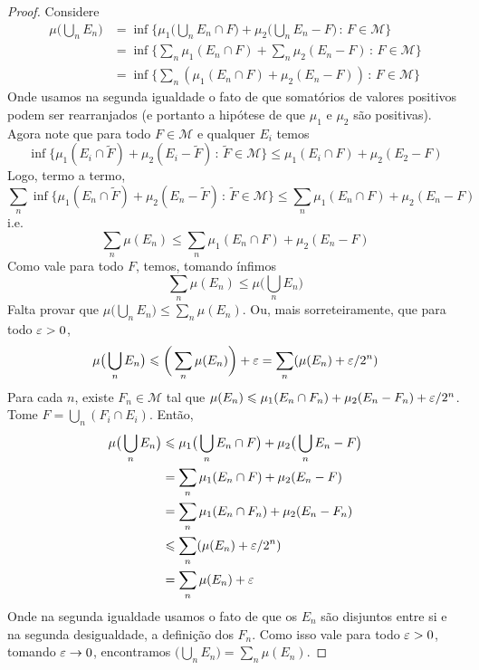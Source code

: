 \begin{proof}
    Considere
    \begin{align*}
        \mu \bigg(\bigcup_{n} E_n \bigg) &= \inf \bigg\{\mu_1\bigg( \bigcup_n E_n \cap F \bigg) + \mu_2\bigg( \bigcup_n E_n - F \bigg) \, : \, F \in \mathcal{M} \bigg\}\\
        &= \inf \bigg\{ \sum_n \mu_1(E_n \cap F) + \sum_n \mu_2(E_n - F) \, : \, F \in \mathcal{M} \bigg\}\\
        &= \inf \bigg\{ \sum_n ( \mu_1(E_n \cap F) + \mu_2(E_n - F) ) \, : \, F \in \mathcal{M} \bigg\}
    \end{align*}
    Onde usamos na segunda igualdade o fato de que somatórios de valores positivos podem ser rearranjados (e portanto a hipótese de que $\mu_1$ e $\mu_2$ são positivas).
    Agora note que para todo $F \in \mathcal{M}$ e qualquer $E_i$ temos
    $$\inf\{\mu_1(E_i \cap \tilde{F}) + \mu_2(E_i - \tilde{F}) \, : \, \tilde{F} \in \mathcal{M}\} \leq \mu_1(E_i \cap F) + \mu_2(E_2 - F)$$
    Logo, termo a termo,
    $$\sum_n \inf\{\mu_1(E_n \cap \tilde{F}) + \mu_2(E_n - \tilde{F}) \, : \, \tilde{F} \in \mathcal{M}\} \leq \sum_n \mu_1(E_n \cap F) + \mu_2(E_n - F)$$
    i.e.
    $$\sum_{n} \mu(E_n) \leq \sum_n \mu_1(E_n \cap F) + \mu_2(E_n - F)$$
    Como vale para todo $F$, temos, tomando ínfimos
    $$\sum_{n} \mu(E_n) \leq \mu \bigg(\bigcup_{n} E_n \bigg)$$
    Falta provar que $\mu\big(\bigcup_{n} E_n \big) \leq \sum_{n} \mu(E_n) $. Ou, mais sorreteiramente, que para 
    todo $\varepsilon > 0$,
    $$ \mu\big(\bigcup_{n} E_n \big) \leqslant \bigg(\sum_{n} \mu(E_n)\bigg) + \varepsilon = \sum_{n} (\mu(E_n) + \varepsilon/2^n )$$
    Para cada $n$, existe $F_n \in \mathcal{M}$ tal que $\mu(E_n) \leqslant \mu_1(E_n \cap F_n) + \mu_2(E_n - F_n) + \varepsilon/2^n$.
    Tome $F = \bigcup_n (F_i \cap E_i)$. Então,
    \begin{align*}
        \mu\big(\bigcup_n E_n \big) &\leqslant \mu_1\big( \bigcup_n E_n \cap F\big) +\mu_2\big( \bigcup_n E_n - F\big)\\
        &= \sum_n \mu_1(E_n \cap F) + \mu_2(E_n - F)\\
        &= \sum_n \mu_1(E_n \cap F_n) + \mu_2(E_n - F_n)\\
        &\leqslant \sum_{n} (\mu(E_n) + \varepsilon/2^n)\\
        &= \sum_{n} \mu(E_n) + \varepsilon
    \end{align*}
    Onde na segunda igualdade usamos o fato de que os $E_n$ são disjuntos entre si e na segunda desigualdade, a definição dos $F_n$.
    Como isso vale para todo $\varepsilon > 0$, tomando $\varepsilon \rightarrow 0$, encontramos $ \big(\bigcup_{n} E_n \big) = \sum_{n} \mu(E_n)$.
\end{proof}

